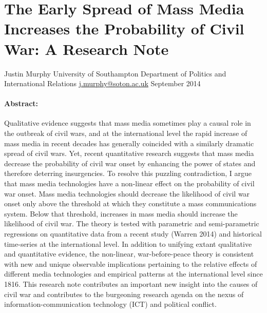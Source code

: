 \documentclass[11pt,article,oneside]{memoir}
\author{}
\date{}
\begin{document}
  
\setsansfont[Mapping=tex-text]{Gill Sans} 
\setmonofont[Mapping=tex-text,Scale=0.8]{Consolas}
\pagestyle{kjh}

\singlespacing





\thispagestyle{empty}

\section{The Early Spread of Mass Media Increases the Probability of
Civil War: A Research
Note}\label{the-early-spread-of-mass-media-increases-the-probability-of-civil-war-a-research-note}

Justin Murphy \newline
University of Southampton \newline     
Department of Politics and International Relations \newline     
\href{mailto:j.murphy@soton.ac.uk}{j.murphy@soton.ac.uk} \newline    
September 2014 \newline        

\paragraph{Abstract:}\label{abstract}

Qualitative evidence suggests that mass media sometimes play a causal
role in the outbreak of civil wars, and at the international level the
rapid increase of mass media in recent decades has generally coincided
with a similarly dramatic spread of civil wars. Yet, recent quantitative
research suggests that mass media decrease the probability of civil war
onset by enhancing the power of states and therefore deterring
insurgencies. To resolve this puzzling contradiction, I argue that mass
media technologies have a non-linear effect on the probability of civil
war onset. Mass media technologies should decrease the likelihood of
civil war onset only above the threshold at which they constitute a mass
communications system. Below that threshold, increases in mass media
should increase the likelihood of civil war. The theory is tested with
parametric and semi-parametric regressions on quantitative data from a
recent study (Warren 2014) and historical time-series at the
international level. In addition to unifying extant qualitative and
quantitative evidence, the non-linear, war-before-peace theory is
consistent with new and unique observable implications pertaining to the
relative effects of different media technologies and empirical patterns
at the international level since 1816. This research note contributes an
important new insight into the causes of civil war and contributes to
the burgeoning research agenda on the nexus of information-communication
technology (ICT) and political conflict.
\end{document}
